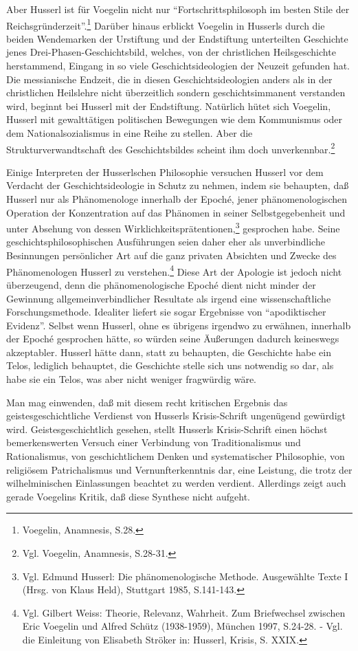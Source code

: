 Aber Husserl ist für Voegelin nicht nur "`Fortschrittsphilosoph im besten
Stile der Reichsgründerzeit"'.\footnote{Voegelin, Anamnesis, S.28.} Darüber
hinaus erblickt Voegelin in Husserls durch die beiden Wendemarken der
Urstiftung und der Endstiftung unterteilten Geschichte jenes
Drei-Phasen-Geschichtsbild, welches, von der christlichen Heilsgeschichte
herstammend, Eingang in so viele Geschichtsideologien der Neuzeit gefunden
hat.  Die messianische Endzeit, die in diesen Geschichtsideologien anders als
in der christlichen Heilslehre nicht überzeitlich sondern geschichtsimmanent
verstanden wird, beginnt bei Husserl mit der Endstiftung. Natürlich hütet sich
Voegelin, Husserl mit gewalttätigen politischen Bewegungen wie dem Kommunismus
oder dem Nationalsozialismus in eine Reihe zu stellen. Aber die
Strukturverwandtschaft des Geschichtsbildes scheint ihm doch
unverkennbar.\footnote{Vgl. Voegelin, Anamnesis, S.28-31.}

Einige Interpreten der Husserlschen Philosophie versuchen Husserl vor dem
Verdacht der Geschichtsideologie in Schutz zu nehmen, indem sie behaupten, daß
Husserl nur als Phänomenologe innerhalb der Epoché, jener
phänomenologischen Operation der Konzentration auf das Phänomen in seiner
Selbstgegebenheit und unter Absehung von dessen
Wirklichkeitsprätentionen,\footnote{Vgl. Edmund Husserl: Die phänomenologische
  Methode. Ausgewählte Texte I (Hrsg. von Klaus Held), Stuttgart 1985,
  S.141-143.} gesprochen habe. Seine geschichtsphilosophischen Ausführungen
seien daher eher als unverbindliche Besinnungen persönlicher Art auf die ganz
privaten Absichten und Zwecke des Phänomenologen Husserl zu
verstehen.\footnote{Vgl.  Gilbert Weiss: Theorie, Relevanz, Wahrheit. Zum
  Briefwechsel zwischen Eric Voegelin und Alfred Schütz (1938-1959), München
  1997, S.24-28. - Vgl. die Einleitung von Elisabeth Ströker in: Husserl,
  Krisis, S. XXIX.} Diese Art der Apologie ist jedoch nicht überzeugend, denn
die phänomenologische Epoché dient nicht minder der Gewinnung
allgemeinverbindlicher Resultate als irgend eine wissenschaftliche
Forschungsmethode. Idealiter liefert sie sogar Ergebnisse von "`apodiktischer
Evidenz"'. Selbst wenn Husserl, ohne es übrigens irgendwo zu erwähnen,
innerhalb der Epoché gesprochen hätte, so würden seine Äußerungen dadurch
keineswegs akzeptabler.  Husserl hätte dann, statt zu behaupten, die
Geschichte habe ein Telos, lediglich behauptet, die Geschichte stelle sich
uns notwendig so dar, als habe sie ein Telos, was aber nicht weniger
fragwürdig wäre.

Man mag einwenden, daß mit diesem recht kritischen Ergebnis das
geistesgeschichtliche Verdienst von Husserls Krisis-Schrift ungenügend
gewürdigt wird. Geistesgeschichtlich gesehen, stellt Husserls Krisis-Schrift
einen höchst bemerkenswerten Versuch einer Verbindung von Traditionalismus und
Rationalismus, von geschichtlichem Denken und systematischer Philosophie, von
religiösem Patrichalismus und Vernunfterkenntnis dar, eine Leistung, die trotz
der wilhelminischen Einlassungen beachtet zu werden verdient. Allerdings zeigt
auch gerade Voegelins Kritik, daß diese Synthese nicht aufgeht.

